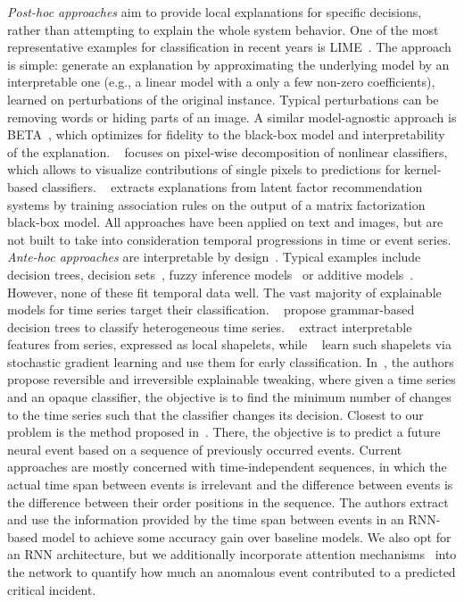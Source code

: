 \documentclass[letterpaper]{article} %
\begin{document}
\textit{Post-hoc approaches} aim to provide local explanations for specific decisions, rather than attempting to explain the whole system behavior. One of the most representative examples for classification in recent years is LIME~\cite{lime}. The approach is simple: generate an explanation by approximating the underlying model by an interpretable one (e.g., a linear model with a only a few non-zero coefficients), learned on perturbations of the original instance. Typical perturbations can be removing words or hiding parts of an image. A similar model-agnostic approach is BETA~\cite{approximations}, which optimizes for fidelity to the black-box model and interpretability of the explanation. ~\cite{layerwise} focuses on pixel-wise decomposition of nonlinear classifiers, which allows to visualize contributions of single pixels to predictions for kernel-based classifiers. ~\cite{mining} extracts explanations from latent factor recommendation systems by training association rules on the output of a matrix factorization black-box model. All approaches have been applied on text and images, but are not built to take into consideration temporal progressions in time or event series.  \textit{Ante-hoc approaches} are interpretable by design~\cite{nphard}. Typical examples include decision trees, decision sets~\cite{decisionsets,anchors}, fuzzy inference models~\cite{pairwise} or additive models~\cite{additive}. However, none of these fit temporal data well.  The vast majority of explainable models for time series target their classification. ~\cite{categorization} propose grammar-based decision trees to classify heterogeneous time series.
~\cite{earlyclass,shapelets} extract interpretable features from series, expressed as local shapelets, while ~\cite{dtw} learn such shapelets via stochastic gradient learning and use them for early classification. In~\cite{irreversible}, the authors propose reversible and irreversible explainable tweaking, where given a time series and an opaque classifier, the objective is to find the minimum number of changes to the time series such that the classifier changes its decision.  Closest to our problem is the method proposed in~\cite{iclr2018}. There, the objective is to predict a future neural event based on a sequence of previously occurred events. Current approaches are mostly concerned with time-independent sequences, in which the actual time span between events is irrelevant and the difference between events is the difference between their order positions in the sequence. The authors extract and use the information provided by the time span between events in an RNN-based model to achieve some accuracy gain over baseline models. We also opt for an RNN architecture, but we additionally incorporate attention mechanisms~\cite{attention} into the network to quantify how much an anomalous event contributed to a predicted critical incident.
\end{document}
